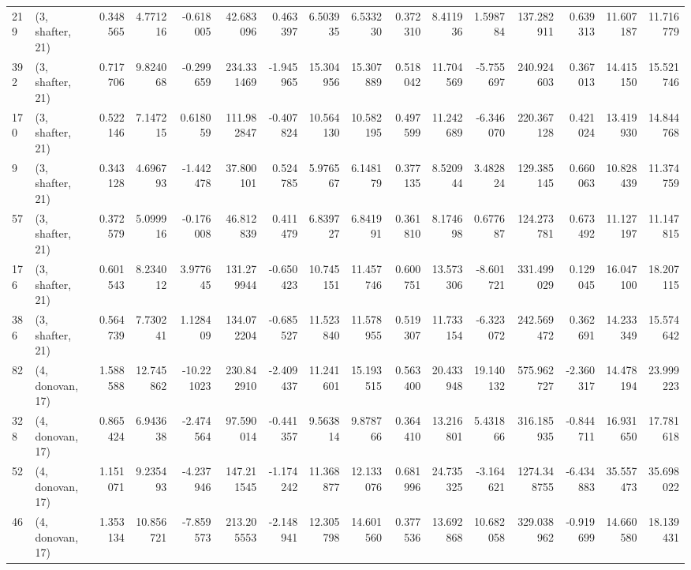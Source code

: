 \begin{tabular}{llrrrrrrrrrrrrrr}
219 &  (3, shafter, 21) &   0.348565 &   4.771216 &  -0.618005 &    42.683096 &   0.463397 &   6.503935 &   6.533230 &  0.372310 &   8.411936 &   1.598784 &   137.282911 &   0.639313 &  11.607187 &  11.716779 \\
392 &  (3, shafter, 21) &   0.717706 &   9.824068 &  -0.299659 &   234.331469 &  -1.945965 &  15.304956 &  15.307889 &  0.518042 &  11.704569 &  -5.755697 &   240.924603 &   0.367013 &  14.415150 &  15.521746 \\
170 &  (3, shafter, 21) &   0.522146 &   7.147215 &   0.618059 &   111.982847 &  -0.407824 &  10.564130 &  10.582195 &  0.497599 &  11.242689 &  -6.346070 &   220.367128 &   0.421024 &  13.419930 &  14.844768 \\
9   &  (3, shafter, 21) &   0.343128 &   4.696793 &  -1.442478 &    37.800101 &   0.524785 &   5.976567 &   6.148179 &  0.377135 &   8.520944 &   3.482824 &   129.385145 &   0.660063 &  10.828439 &  11.374759 \\
57  &  (3, shafter, 21) &   0.372579 &   5.099916 &  -0.176008 &    46.812839 &   0.411479 &   6.839727 &   6.841991 &  0.361810 &   8.174698 &   0.677687 &   124.273781 &   0.673492 &  11.127197 &  11.147815 \\
176 &  (3, shafter, 21) &   0.601543 &   8.234012 &   3.977645 &   131.279944 &  -0.650423 &  10.745151 &  11.457746 &  0.600751 &  13.573306 &  -8.601721 &   331.499029 &   0.129045 &  16.047100 &  18.207115 \\
386 &  (3, shafter, 21) &   0.564739 &   7.730241 &   1.128409 &   134.072204 &  -0.685527 &  11.523840 &  11.578955 &  0.519307 &  11.733154 &  -6.323072 &   242.569472 &   0.362691 &  14.233349 &  15.574642 \\
82  &  (4, donovan, 17) &   1.588588 &  12.745862 & -10.221023 &   230.842910 &  -2.409437 &  11.241601 &  15.193515 &  0.563400 &  20.433948 &  19.140132 &   575.962727 &  -2.360317 &  14.478194 &  23.999223 \\
328 &  (4, donovan, 17) &   0.865424 &   6.943638 &  -2.474564 &    97.590014 &  -0.441357 &   9.563814 &   9.878766 &  0.364410 &  13.216801 &   5.431866 &   316.185935 &  -0.844711 &  16.931650 &  17.781618 \\
52  &  (4, donovan, 17) &   1.151071 &   9.235493 &  -4.237946 &   147.211545 &  -1.174242 &  11.368877 &  12.133076 &  0.681996 &  24.735325 &  -3.164621 &  1274.348755 &  -6.434883 &  35.557473 &  35.698022 \\
46  &  (4, donovan, 17) &   1.353134 &  10.856721 &  -7.859573 &   213.205553 &  -2.148941 &  12.305798 &  14.601560 &  0.377536 &  13.692868 &  10.682058 &   329.038962 &  -0.919699 &  14.660580 &  18.139431 \\

\end{tabular}
